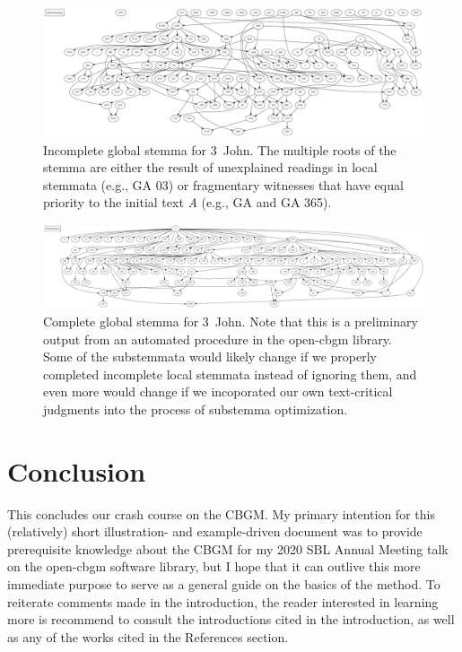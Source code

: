 \documentclass[a4paper, 12pt]{article}
\begin{document}
	\begin{figure}
		\centering
		\includegraphics[width=\textwidth]{../graphics/global-stemma-incomplete.pdf}
		\caption{Incomplete global stemma for 3~John. The multiple roots of the stemma are either the result of unexplained readings in local stemmata (e.g., GA 03) or fragmentary witnesses that have equal priority to the initial text \emph{A} (e.g., GA  and GA 365).}
		\label{fig:global-stemma-incomplete}
	\end{figure}
	
	\begin{figure}
		\centering
		\includegraphics[width=\textwidth]{../graphics/global-stemma.pdf}
		\caption{Complete global stemma for 3~John. Note that this is a preliminary output from an automated procedure in the \textsf{open-cbgm} library. Some of the substemmata would likely change if we properly completed incomplete local stemmata instead of ignoring them, and even more would change if we incoporated our own text-critical judgments into the process of substemma optimization.}
		\label{fig:global-stemma}
	\end{figure}
	
	\newpage
	
	\section*{Conclusion}\label{sec:conclusion}
	This concludes our crash course on the CBGM. My primary intention for this (relatively) short illustration- and example-driven document was to provide prerequisite knowledge about the CBGM for my 2020 SBL Annual Meeting talk on the \textsf{open-cbgm} software library, but I hope that it can outlive this more immediate purpose to serve as a general guide on the basics of the method. To reiterate comments made in the introduction, the reader interested in learning more is recommend to consult the introductions cited in the introduction, as well as any of the works cited in the References section.
	
	\printbibliography
\end{document}
